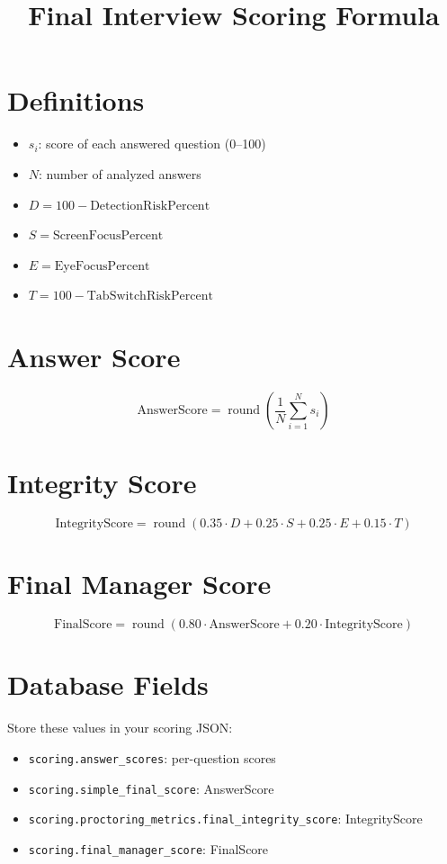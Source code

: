 \documentclass[11pt]{article}
\title{Final Interview Scoring Formula}
\date{}
\begin{document}
\maketitle

\section*{Definitions}
\begin{itemize}[leftmargin=1.2em]
  \item $s_i$: score of each answered question (0--100)
  \item $N$: number of analyzed answers
  \item $D = 100 - \text{DetectionRiskPercent}$
  \item $S = \text{ScreenFocusPercent}$
  \item $E = \text{EyeFocusPercent}$
  \item $T = 100 - \text{TabSwitchRiskPercent}$
\end{itemize}

\section*{Answer Score}
\[
\text{AnswerScore} = \operatorname{round}\left(\frac{1}{N}\sum_{i=1}^{N} s_i\right)
\]

\section*{Integrity Score}
\[
\text{IntegrityScore} = \operatorname{round}\left(
0.35 \cdot D +
0.25 \cdot S +
0.25 \cdot E +
0.15 \cdot T
\right)
\]

\section*{Final Manager Score}
\[
\text{FinalScore} = \operatorname{round}\left(
0.80 \cdot \text{AnswerScore} +
0.20 \cdot \text{IntegrityScore}
\right)
\]

\section*{Database Fields}
Store these values in your scoring JSON:
\begin{itemize}[leftmargin=1.2em]
  \item \texttt{scoring.answer\_scores}: per-question scores
  \item \texttt{scoring.simple\_final\_score}: AnswerScore
  \item \texttt{scoring.proctoring\_metrics.final\_integrity\_score}: IntegrityScore
  \item \texttt{scoring.final\_manager\_score}: FinalScore
\end{itemize}
\end{document}
